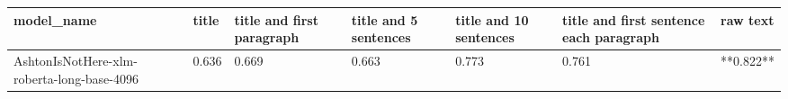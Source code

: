 \begin{tabular}{lllllll}
\toprule
                                model\_name & title & title and first paragraph & title and 5 sentences & title and 10 sentences & title and first sentence each paragraph &  raw text \\
\midrule
AshtonIsNotHere-xlm-roberta-long-base-4096 & 0.636 &                     0.669 &                 0.663 &                  0.773 &                                   0.761 & **0.822** \\
\bottomrule
\end{tabular}
